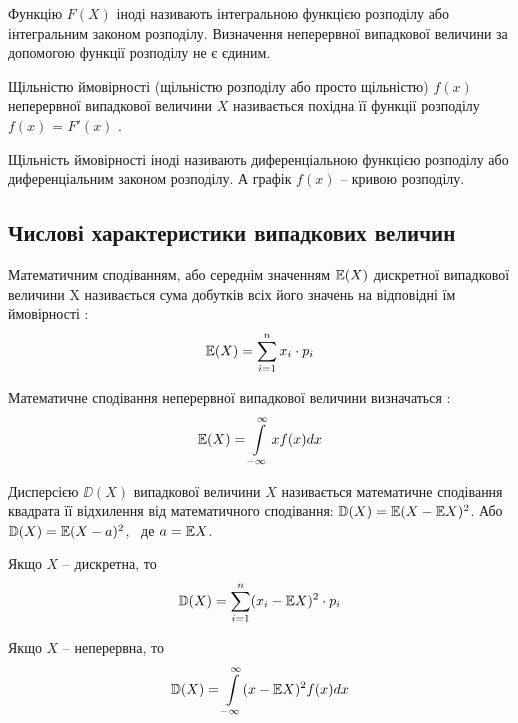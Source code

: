 Функцію $F(X)$ іноді називають інтегральною функцією розподілу або інтегральним законом розподілу. Визначення неперервної випадкової величини за допомогою функції розподілу не є єдиним.

\begin{defin}
Щільністю ймовірності (щільністю розподілу або просто щільністю) $f(x)$ неперервної випадкової величини $X$ називається похідна її функції розподілу $f(x)$ = $F'(x)$ \cite{Kremer}.
\end{defin}

Щільність ймовірності іноді називають диференціальною функцією розподілу або диференціальним законом розподілу. А графік $f(x)$ – кривою розподілу.

\subsection{Числові характеристики випадкових величин}
\begin{defin}
	Математичним сподіванням, або середнім значенням $\mathbb{E}(X)$ дискретної випадкової величини X називається сума добутків всіх його значень на відповідні їм ймовірності \cite{Kremer}:
	\begin{equation}
		\mathbb{E}(X)= \sum\limits_{i=1}^n x_i \cdot p_i
	\end{equation}
\end{defin}

\begin{defin}
	Математичне сподівання неперервної випадкової величини визначаться \cite{Kremer}:
	\begin{equation}
		\mathbb{E}(X)= \int\limits_{-\infty}^\infty x f(x) dx
	\end{equation}
\end{defin}

\begin{defin}
	Дисперсією $\DD(X)$ випадкової величини $X$ називається математичне сподівання квадрата її відхилення від математичного сподівання: $\mathbb{D}(X)=\mathbb{E}(X-\mathbb{E} X)^2$. Або $\mathbb{D}(X)=\mathbb{E}(X - a)^2$, ~де $a=\mathbb{E} X$.
	
	Якщо $X$ – дискретна, то
	\begin{equation}
		\mathbb{D}(X)=\sum\limits_{i=1}^n (x_i - \mathbb{E} X)^2 \cdot p_i
	\end{equation}
	
	Якщо $X$ – неперервна, то
	\begin{equation}
		\mathbb{D}(X)=\int\limits_{-\infty}^\infty (x - \mathbb{E} X)^2 f(x) dx
	\end{equation}
\end{defin}

